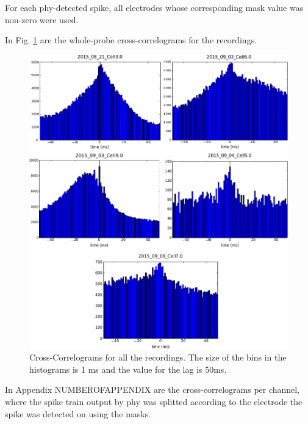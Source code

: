 \documentclass{article}
\begin{document}
For each phy-detected spike, all electrodes whose corresponding mask value was non-zero were used.

In Fig. \ref{fig:CC} are the whole-probe cross-correlograms for the recordings.

\begin{figure}[!h]
	\centering
	\includegraphics{CC.pdf}
	\caption{Cross-Correlograms for all the recordings. The size of the bins in the histograms is 1 ms and the value for the lag is 50ms.
}
\label{fig:CC}
\end{figure}

In Appendix NUMBEROFAPPENDIX are the cross-correlograms per channel, where the spike train output by phy was splitted according to the electrode the spike was detected on using the masks.
\end{document}

